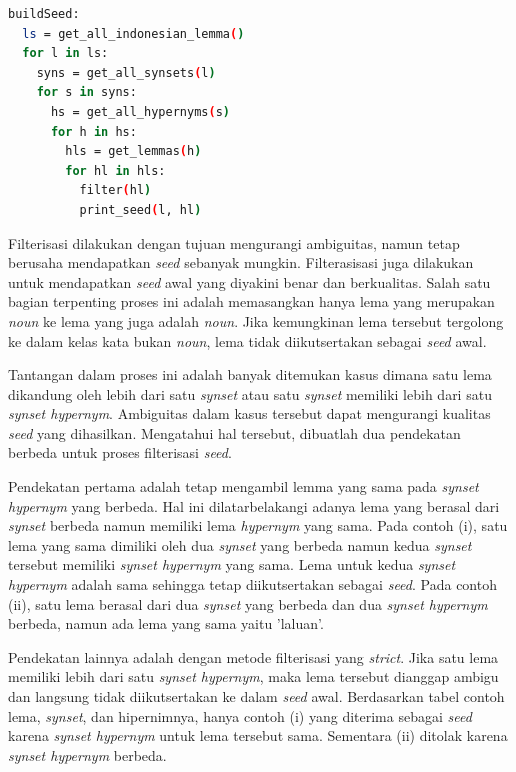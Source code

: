 \begin{lstlisting}[caption={Algoritme pembentukan \textit{seed}}, language=bash]
buildSeed:
  ls = get_all_indonesian_lemma()
  for l in ls:
    syns = get_all_synsets(l)
    for s in syns:
      hs = get_all_hypernyms(s)
      for h in hs: 
        hls = get_lemmas(h)
        for hl in hls:
          filter(hl)
          print_seed(l, hl)
\end{lstlisting}

Filterisasi dilakukan dengan tujuan mengurangi ambiguitas, namun tetap berusaha mendapatkan \textit{seed} sebanyak mungkin. Filterasisasi juga dilakukan untuk mendapatkan \textit{seed} awal yang diyakini benar dan berkualitas. Salah satu bagian terpenting proses ini adalah memasangkan hanya lema yang merupakan \textit{noun} ke lema yang juga adalah \textit{noun}. Jika kemungkinan lema tersebut tergolong ke dalam kelas kata bukan \textit{noun}, lema tidak diikutsertakan sebagai \textit{seed} awal.

Tantangan dalam proses ini adalah banyak ditemukan kasus dimana satu lema dikandung oleh lebih dari satu \textit{synset} atau satu \textit{synset} memiliki lebih dari satu \textit{synset hypernym}. Ambiguitas dalam kasus tersebut dapat mengurangi kualitas \textit{seed} yang dihasilkan. Mengatahui hal tersebut, dibuatlah dua pendekatan berbeda untuk proses filterisasi \textit{seed}.

Pendekatan pertama adalah tetap mengambil lemma yang sama pada \textit{synset hypernym} yang berbeda. Hal ini dilatarbelakangi adanya lema yang berasal dari \textit{synset} berbeda namun memiliki lema \textit{hypernym} yang sama. Pada contoh (i), satu lema yang sama dimiliki oleh dua \textit{synset} yang berbeda namun kedua \textit{synset} tersebut memiliki \textit{synset hypernym} yang sama. Lema untuk kedua \textit{synset hypernym} adalah sama sehingga tetap diikutsertakan sebagai \textit{seed}. Pada contoh (ii), satu lema berasal dari dua \textit{synset} yang berbeda dan dua \textit{synset hypernym} berbeda, namun ada lema yang sama yaitu 'laluan'.

Pendekatan lainnya adalah dengan metode filterisasi yang \textit{strict}. Jika satu lema memiliki lebih dari satu \textit{synset hypernym}, maka lema tersebut dianggap ambigu dan langsung tidak diikutsertakan ke dalam \textit{seed} awal. Berdasarkan tabel contoh lema, \textit{synset}, dan hipernimnya, hanya contoh (i) yang diterima sebagai \textit{seed} karena \textit{synset hypernym} untuk lema tersebut sama. Sementara (ii) ditolak karena \textit{synset hypernym} berbeda.

